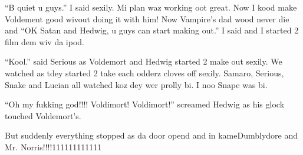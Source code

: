 \enquote{B quiet u guys.} I said sexily. Mi plan waz working oot great. Now I kood make Voldement good wivout doing it with him! Now Vampire's dad wood never die and \enquote{OK Satan and Hedwig, u guys can start making out.} I said and I started 2 film dem wiv da ipod.

\enquote{Kool.} said Serious as Voldemort and Hedwig started 2 make out sexily. We watched as tdey started 2 take each odderz cloves off sexily. Samaro, Serious, Snake and Lucian all watched koz dey wer prolly bi. I noo Snape was bi.

\enquote{Oh my fukking god!!!! Voldimort! Voldimort!} screamed Hedwig as his glock touched Voldemort's.

But suddenly everything stopped as da door opend and in kame\newline\phantom{}\dotfill Dumblydore and Mr. Norris!!!!111111111111

